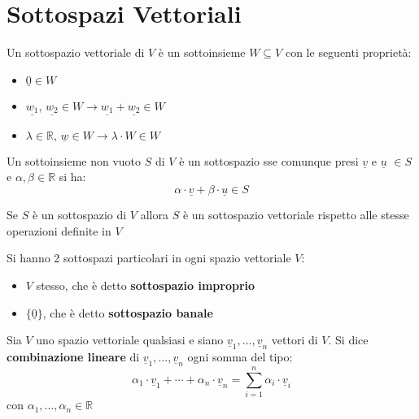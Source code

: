 \documentclass[a4paper,12pt, oneside]{book}
\begin{document}
\section{Sottospazi Vettoriali}
\begin{definizione}
	Un sottospazio vettoriale di $V$ è un sottoinsieme $W\subseteq V$ con le seguenti proprietà:
	\begin{itemize}
		\item $\underline{0}\in W$
		\item $\underline{w_1},\,\underline{w_2}\in W\longrightarrow \underline{w_1}+\underline{w_2}\in W$
		\item $\lambda\in\mathbb{R},\,\underline{w}\in W \longrightarrow \lambda\cdot W \in W	$
	\end{itemize}
\end{definizione}
\begin{teorema}
	Un sottoinsieme non vuoto $S$ di $V$ è un sottospazio sse comunque presi $\underline{v}$ e $\underline{u}$ $\in S$ e $\alpha,\beta \in \mathbb{R}$ si ha:
	$$\alpha\cdot \underline{v}+\beta\cdot \underline{u}\in S$$
\end{teorema}
\begin{teorema}
	Se $S$ è un sottospazio di $V$ allora $S$ è un sottospazio vettoriale rispetto alle stesse operazioni definite in $V$
\end{teorema}
\begin{definizione}
	Si hanno 2 sottospazi particolari in ogni spazio vettoriale $V$:
	\begin{itemize}
		\item $V$ stesso, che è detto \textbf{sottospazio improprio}
		\item $\{\underline{0}\}$, che è detto \textbf{sottospazio banale}
	\end{itemize}
\end{definizione}
\begin{definizione}
	Sia $V$ uno spazio vettoriale qualsiasi e siano $\underline{v}_1,...,\underline{v}_n$ vettori di $V$. Si dice \textbf{combinazione lineare} di $\underline{v}_1,...,\underline{v}_n$ ogni somma del tipo:
	$$\alpha_1\cdot \underline{v}_1+\cdots+\alpha_n\cdot \underline{v}_n=\sum_{i=1}^n \alpha_i\cdot \underline{v}_i$$
	con $\alpha_1,...,\alpha_n \in \mathbb{R}$
\end{definizione}
\end{document}

